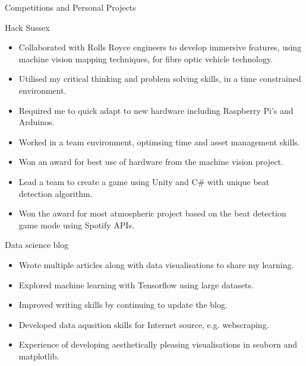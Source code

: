 \documentclass[a4paper]{article}
\newlength{\tabin}
\newlength{\secsep}
\newcommand{\lineunder}{\vspace*{-8pt} \\ \hspace*{-6pt} \hrulefill \\ \vspace*{-15pt}}
\newenvironment{tabbedsection}[1]{
  \begin{list}{}{
      \setlength{\itemsep}{0pt}
      \setlength{\labelsep}{0pt}
      \setlength{\labelwidth}{0pt}
      \setlength{\leftmargin}{\tabin}
      \setlength{\rightmargin}{\tabin}
      \setlength{\listparindent}{0pt}
      \setlength{\parsep}{0pt}
      \setlength{\parskip}{0pt}
      \setlength{\partopsep}{0pt}
      \setlength{\topsep}{#1}
    }
  \item[]
}{\end{list}}
\newenvironment{resume_section}[1]{
  \filbreak
  \vspace{2\secsep}
  \textsc{\large#1}
  \lineunder
  \begin{tabbedsection}{\secsep}
}{\end{tabbedsection}}
\newenvironment{resume_subsection}[2][]{
  \textbf{#2} \hfill {\footnotesize #1} \hspace{2em}
  \begin{tabbedsection}{0.5\secsep}
}{\end{tabbedsection}}
\newenvironment{subitems}{
  \renewcommand{\labelitemi}{-}
  \begin{itemize}
      \setlength{\labelsep}{1em}
}{\end{itemize}}
\begin{document}
\begin{resume_section}{Competitions and Personal Projects}
  \begin{resume_subsection}[(November 2018 \& 2019)]{Hack Sussex}
    \begin{subitems}
    \item Collaborated with Rolls Royce engineers to develop immersive features, using machine vision mapping techniques, for fibre optic vehicle technology. 
    \item Utilised my critical thinking and problem solving skills, in a time constrained environment.
    \item Required me to quick adapt to new hardware including Raspberry Pi's and Arduinos.
    \item Worked in a team environment, optimsing time and asset management skills.
    \item Won an award for best use of hardware from the machine vision project.
    \item Lead a team to create a game using Unity and C\# with unique beat detection algorithm.
    \item Won the award for most atmospheric project based on the beat detection game mode using Spotify APIs.
    \end{subitems}
  \end{resume_subsection}

    \begin{resume_subsection}{Data science blog}
    \begin{subitems}
        \item Wrote multiple articles along with data visualisations to share my learning.
        \item Explored machine learning with Tensorflow using large datasets.
        \item Improved writing skills by continuing to update the blog.
        \item Developed data aqusition skills for Internet source, e.g. webscraping.
        \item Experience of developing aesthetically pleasing visualisations in seaborn and matplotlib.
    \end{subitems}
  \end{resume_subsection}
\end{resume_section}
\end{document}
